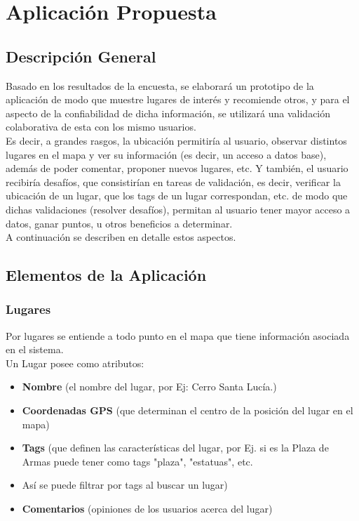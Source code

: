 \documentclass[10pt,letterpaper]{article}
\begin{document}
\newpage
\section{Aplicación Propuesta}

\subsection{Descripción General}

Basado en los resultados de la encuesta, se elaborará un prototipo de la aplicación de modo que muestre lugares de interés y recomiende otros, y para el aspecto de la confiabilidad de dicha información, se utilizará una validación colaborativa de esta con los mismo usuarios.\\

Es decir, a grandes rasgos, la ubicación permitiría al usuario, observar distintos lugares en el mapa y ver su información (es decir, un acceso a datos base), además de poder comentar, proponer nuevos lugares, etc. 
Y también, el usuario recibiría desafíos, que consistirían en tareas de validación, es decir, verificar la ubicación de un lugar, que los tags de un lugar correspondan, etc. de modo que dichas validaciones (resolver desafíos), permitan al usuario tener mayor acceso a datos, ganar puntos, u otros beneficios a determinar.\\

A continuación se describen en detalle estos aspectos.\\

\subsection{Elementos de la Aplicación}

\subsubsection{Lugares}

Por lugares se entiende a todo punto en el mapa que tiene información asociada en el sistema.\\

Un Lugar posee como atributos:\\

\begin{itemize}
 \item \textbf{Nombre} (el nombre del lugar, por Ej: Cerro Santa Lucía.)
 \item \textbf{Coordenadas GPS} (que determinan el centro de la posición del lugar en el mapa)
 \item \textbf{Tags} (que definen las características del lugar, por Ej. si es la Plaza de Armas puede tener como tags "plaza", "estatuas", etc.  \item Así se puede filtrar por tags al buscar un lugar)
 \item \textbf{Comentarios} (opiniones de los usuarios acerca del lugar)
\end{itemize}
\end{document}
